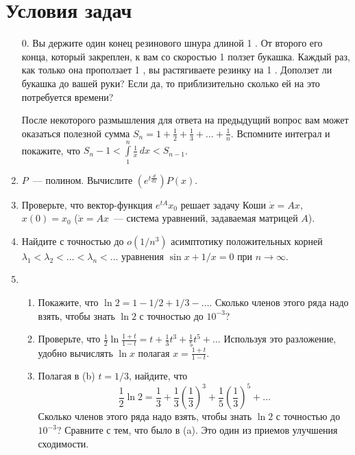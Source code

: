 \documentclass[a4paper]{article}
\begin{document}
\medskip\dmvntrail

\newpage

\section*{Условия задач}

\begin{enumerate}
  \item[0.] Вы держите один конец резинового шнура длиной 1 . От
  второго его конца, который закреплен, к вам со скоростью 1 
  ползет букашка. Каждый раз, как только она проползает 1
  , вы растягиваете резинку на 1 . Доползет
  ли букашка до вашей руки? Если да, то приблизительно сколько ей на
  это потребуется времени?

  После некоторого размышления для ответа на предыдущий вопрос вам
  может оказаться полезной сумма $S_n=1+\frac{1}{2}+\frac{1}{3}+\ldots+
  \frac{1}{n}$. Вспомните интеграл и покажите, что $S_n-1<\int\limits_1^n
  \frac{1}{x}\,dx<S_{n-1}$.
  \item $P$~--- полином. Вычислите $(e^{t\frac{d}{dx}})P(x)$.
  \item Проверьте, что вектор-функция $e^{tA}x_0$ решает задачу Коши
  $\dot{x}=Ax$, $x(0)=x_0$ ($\dot{x}=Ax$~--- система уравнений, задаваемая матрицей
  $A$).
  \item Найдите с точностью до $o(1/n^3)$ асимптотику положительных
  корней $\lambda_1<\lambda_2<\ldots<\lambda_n<\ldots$ уравнения $\sin x +
  1/x=0$ при $n\rightarrow\infty$.
  \item \begin{enumerate}
          \item Покажите, что $\ln 2=1-1/2+1/3-\ldots$. Сколько
          членов этого ряда надо взять, чтобы знать $\ln 2$ с
          точностью до $10^{-3}$?
          \item Проверьте, что $\frac{1}{2}\ln\frac{1+t}{1-t}=t+\frac{1}{3}t^3+
          \frac{1}{5}t^5+\ldots$ Используя это разложение, удобно
          вычислять $\ln x$ полагая $x=\frac{1+t}{1-t}$.
          \item Полагая в (b) $t=1/3$, найдите, что
          $$\frac{1}{2}\ln 2=\frac{1}{3}+\frac{1}{3}\left(\frac{1}{3}\right)^3
          +\frac{1}{5}\left(\frac{1}{3}\right)^5+\ldots$$
          Сколько членов этого ряда надо взять, чтобы знать $\ln 2$ с
          точностью до $10^{-3}$? Сравните с тем, что было в (a).
          Это один из приемов улучшения сходимости.
        \end{enumerate}

\end{enumerate}
\end{document}
